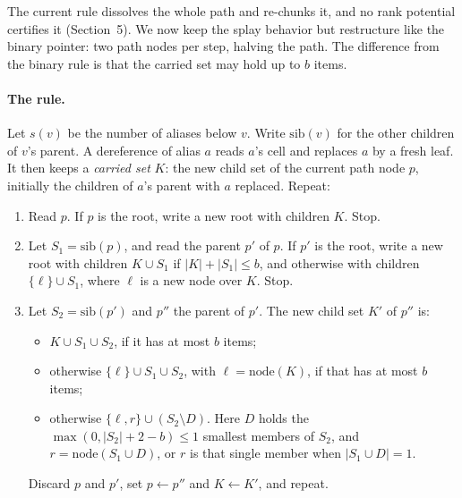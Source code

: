 \documentclass[11pt]{article}
\theoremstyle{definition}
\begin{document}
The current rule dissolves the whole path and re-chunks it, and no rank
potential certifies it (Section~5). We now keep the splay behavior but
restructure like the binary pointer: two path nodes per step, halving the
path. The difference from the binary rule is that the carried set may hold up
to $b$ items.

\paragraph{The rule.} Let $s(v)$ be the number of aliases below $v$. Write
$\mathrm{sib}(v)$ for the other children of $v$'s parent. A dereference of
alias $a$ reads $a$'s cell and replaces $a$ by a fresh leaf. It then keeps a
\emph{carried set} $K$: the new child set of the current path node $p$,
initially the children of $a$'s parent with $a$ replaced. Repeat:
\begin{enumerate}
\item Read $p$. If $p$ is the root, write a new root with children $K$. Stop.
\item Let $S_1=\mathrm{sib}(p)$, and read the parent $p'$ of $p$. If $p'$ is
  the root, write a new root with children $K\cup S_1$ if $|K|+|S_1|\le b$,
  and otherwise with children $\{\ell\}\cup S_1$, where $\ell$ is a new node
  over $K$. Stop.
\item Let $S_2=\mathrm{sib}(p')$ and $p''$ the parent of $p'$. The new child
  set $K'$ of $p''$ is:
  \begin{itemize}
  \item[(A0)] $K\cup S_1\cup S_2$, if it has at most $b$ items;
  \item[(A)] otherwise $\{\ell\}\cup S_1\cup S_2$, with $\ell=\mathrm{node}(K)$,
    if that has at most $b$ items;
  \item[(B)] otherwise $\{\ell,r\}\cup(S_2\setminus D)$. Here $D$ holds the
    $\max(0,|S_2|+2-b)\le 1$ smallest members of $S_2$, and
    $r=\mathrm{node}(S_1\cup D)$, or $r$ is that single member when
    $|S_1\cup D|=1$.
  \end{itemize}
  Discard $p$ and $p'$, set $p\leftarrow p''$ and $K\leftarrow K'$, and
  repeat.
\end{enumerate}
\end{document}
